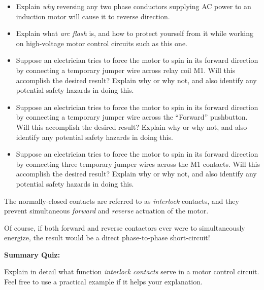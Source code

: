 \begin{itemize}
\item{} Explain {\it why} reversing any two phase conductors supplying AC power to an induction motor will cause it to reverse direction.
\item{} Explain what {\it arc flash} is, and how to protect yourself from it while working on high-voltage motor control circuits such as this one.
\item{} Suppose an electrician tries to force the motor to spin in its forward direction by connecting a temporary jumper wire across relay coil M1.  Will this accomplish the desired result?  Explain why or why not, and also identify any potential safety hazards in doing this.
\item{} Suppose an electrician tries to force the motor to spin in its forward direction by connecting a temporary jumper wire across the ``Forward'' pushbutton.  Will this accomplish the desired result?  Explain why or why not, and also identify any potential safety hazards in doing this.
\item{} Suppose an electrician tries to force the motor to spin in its forward direction by connecting three temporary jumper wires across the M1 contacts.  Will this accomplish the desired result?  Explain why or why not, and also identify any potential safety hazards in doing this.
\end{itemize}







The normally-closed contacts are referred to as {\it interlock} contacts, and they prevent simultaneous {\it forward} and {\it reverse} actuation of the motor.
 






Of course, if both forward and reverse contactors ever were to simultaneously energize, the result would be a direct phase-to-phase short-circuit!









\vfil \eject

\noindent
{\bf Summary Quiz:}

Explain in detail what function {\it interlock contacts} serve in a motor control circuit.   Feel free to use a practical example if it helps your explanation.




